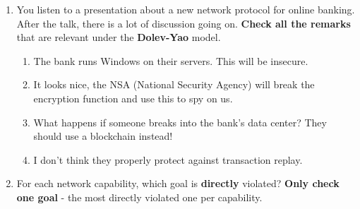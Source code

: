 \documentclass{article} %
\newcommand{\incorrectOption}{\textbf{\Circle}}
\begin{document}
\begin{enumerate}[leftmargin=*, label=\textbf{Q\arabic*}, itemsep=-5pt]
\item You listen to a presentation about a new network protocol for
  online banking. After the talk, there is a lot of discussion going
  on. \textbf{Check all the remarks} that are relevant under the \textbf{Dolev-Yao} model.  
  \begin{enumerate}[itemsep=-3.5pt, label={}]
   \item[\incorrectOption] The bank runs Windows on their servers. This will
    be insecure.
   \item[\incorrectOption] It looks nice, the NSA (National Security Agency)
    will break the encryption function and use this to spy on us.
    \item[\incorrectOption] What happens if someone breaks into the bank's
    data center? They should use a blockchain instead!
    \item[\incorrectOption] I don't think they properly protect against
    transaction replay.
   \end{enumerate}   
\item For each network capability, which goal is {\bf{}directly}
  violated? {\bf{}Only check one goal} - the most directly violated
  one per capability.


\end{enumerate}
\end{document}
